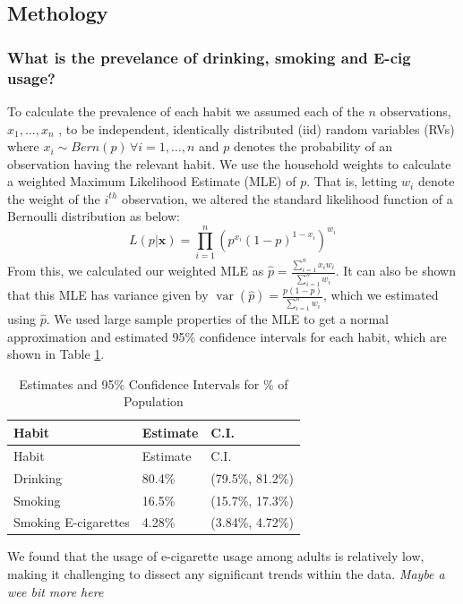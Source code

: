 \documentclass[
  11pt,
]{article}
\begin{document}
\subsection{Methology}\label{methology}

\subsubsection{What is the prevelance of drinking, smoking and E-cig
usage?}\label{what-is-the-prevelance-of-drinking-smoking-and-e-cig-usage}

To calculate the prevalence of each habit we assumed each of the \(n\)
observations, \(x_1,…,x_n\) , to be independent, identically distributed
(iid) random variables (RVs) where
\(x_i \sim Bern(p)\, \forall i=1,…,n\) and \(p\) denotes the probability
of an observation having the relevant habit. We use the household
weights to calculate a weighted Maximum Likelihood Estimate (MLE) of
\(p\). That is, letting \(w_i\) denote the weight of the \(i^{th}\)
observation, we altered the standard likelihood function of a Bernoulli
distribution as below:
\[L(p|\textbf{x}) = \prod_{i = 1}^{n} (p^{x_i}(1-p)^{1-x_i})^{w_i}\]
From this, we calculated our weighted MLE as
\(\widehat{p} = \frac{\sum_{i=1}^{n} x_iw_i}{\sum_{i=1}^{n} w_i}\). It
can also be shown that this MLE has variance given by
\(\mathop{\mathrm{var}}(\widehat{p})=\frac{p(1-p)}{\sum_{i=1}^{n}w_i}\),
which we estimated using \(\widehat{p}\). We used large sample
properties of the MLE to get a normal approximation and estimated 95\%
confidence intervals for each habit, which are shown in Table
\ref{tab:output-estimates-table}.

\begin{longtable}[]{@{}lll@{}}
\caption{Estimates and 95\% Confidence Intervals for \% of
Population\label{tab:output-estimates-table}}\tabularnewline
\toprule\noalign{}
Habit & Estimate & C.I. \\
\midrule\noalign{}
\endfirsthead
\toprule\noalign{}
Habit & Estimate & C.I. \\
\midrule\noalign{}
\endhead
\bottomrule\noalign{}
\endlastfoot
Drinking & 80.4\% & (79.5\%, 81.2\%) \\
Smoking & 16.5\% & (15.7\%, 17.3\%) \\
Smoking E-cigarettes & 4.28\% & (3.84\%, 4.72\%) \\
\end{longtable}

We found that the usage of e-cigarette usage among adults is relatively
low, making it challenging to dissect any significant trends within the
data. \emph{Maybe a wee bit more here}
\end{document}
